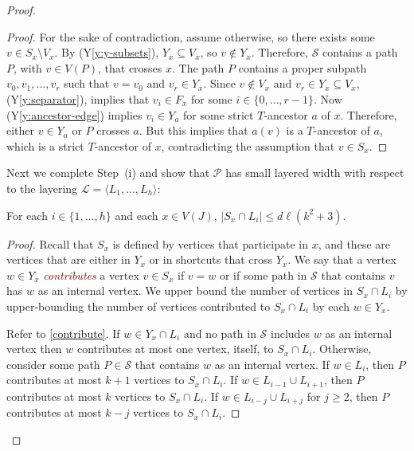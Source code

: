 \documentclass{patmorin}
\newcommand{\defin}[1]{\textcolor{Maroon}{\emph{#1}}}
\newcommand{\note}[2]{\noindent{\color{red}[#1:~#2]}}
\newcommand{\referee}[2]{\noindent\textcolor{blue}{\framebox{\begin{minipage}{\textwidth} Ref \#{#1}: #2\end{minipage}}}}
\newcommand{\yref}[1]{(Y\ref{y:#1})}
\newcommand{\PP}{\mathcal{P}}
\renewcommand{\SS}{\mathcal{S}}
\renewcommand{\ge}{\geqslant}
\renewcommand{\le}{\leqslant}
\begin{document}
\begin{proof}
\begin{proof}
  For the sake of contradiction, assume otherwise, so there exists some $v\in S_x\setminus V_x$. By \yref{y-subsets}, $Y_x\subseteq V_x$, so $v\not\in Y_x$.  Therefore, $\SS$ contains a path $P$, with $v\in V(P)$, that crosses $x$.  The path $P$ contains a proper subpath $v_0,v_1,\ldots,v_{r}$ such that $v=v_0$ and $v_r\in Y_x$. Since $v\not\in V_x$ and $v_r\in Y_x\subseteq V_x$, \yref{separator}, implies that $v_i\in F_x$ for some $i\in\{0,\ldots,r-1\}$. Now \yref{ancestor-edge} implies $v_i\in Y_a$ for some strict $T$-ancestor $a$ of $x$.  Therefore, either $v\in Y_a$ or $P$ crosses $a$. But this implies that $a(v)$ is a $T$-ancestor of $a$, which is a strict $T$-ancestor of $x$, contradicting the assumption that $v\in S_x$.
\end{proof}

Next we complete Step~(i) and show that $\PP$ has small layered width with respect to the layering $\mathcal{L}=\langle L_1,\ldots,L_h\rangle$:

\begin{clm}
	\label{general-width}
  For each $i\in\{1,\ldots,h\}$ and each $x\in V(J)$, $|S_x\cap L_i|\le d\ell(k^2+3)$.
\end{clm}

\begin{proof}
  Recall that $S_x$ is defined by vertices that participate in $x$, and these are vertices that are either in $Y_x$ or in shortcuts that cross $Y_x$.  We say that a vertex $w\in Y_x$ \defin{contributes} a vertex $v\in S_x$ if $v=w$ or if some path in $\SS$ that contains $v$ has $w$ as an internal vertex.
  We upper bound the number of vertices in $S_x\cap L_i$ by upper-bounding the number of vertices contributed to $S_x\cap L_i$ by each $w\in Y_x$.

  Refer to \cref{contribute}.  If $w\in Y_x\cap L_i$ and no path in $\SS$ includes $w$ as an internal vertex then $w$ contributes at most one vertex, itself, to $S_x\cap L_i$.
  Otherwise, consider some path $P\in\SS$ that contains $w$ as an internal vertex.  If $w\in L_{i}$, then $P$ contributes at most $k+1$ vertices to $S_x\cap L_i$.  If $w\in L_{i-1}\cup L_{i+1}$, then $P$ contributes at most $k$ vertices to $S_x\cap L_i$. If $w\in L_{i-j}\cup L_{i+j}$ for $j\ge 2$, then $P$ contributes at most $k-j$ vertices to $S_x\cap L_i$.
%
%


\end{proof}
\end{proof}
\end{document}
